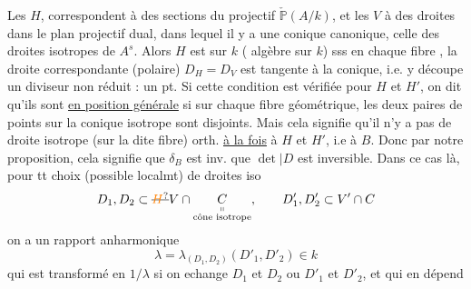  

Les $H$, correspondent à des sections  du   projectif   $\check{\mathbb{P}}(A/k)$, et les $V$ à des droites dans le plan projectif dual, dans lequel il y a une conique canonique, celle des droites isotropes de $A^s$. Alors $H$ est  sur $k$ ( algèbre sur $k$) sss en chaque  fibre , la droite correspondante (polaire) $D_H=D_V$ est tangente à la conique, i.e. y découpe un diviseur  non réduit : un pt. Si cette condition est vérifiée pour
$H$ et $H'$, on dit qu'ils sont \uline{en position générale} si sur chaque fibre géométrique, les deux paires de points sur la conique isotrope sont disjoints. Mais cela signifie  qu'il n'y a pas de droite isotrope (sur la dite fibre) orth. \uline{à la fois} à $H$ et $H'$, i.e à $B$. Donc par notre proposition, cela signifie que $\delta_B$ est inv.  que $\det\big|D$ est inversible.  Dans ce cas là,  pour tt choix (possible localmt)  de droites iso
\[
 D_1,D_2\subset \deleted{\unsure{H}}V\cap\underset{\substack{\shortparallel\\\text{cône isotrope}}}{C},\qquad D'_1,D'_2\subset V'\cap C
\]
on a un rapport anharmonique
\[
 \lambda=\lambda_{(D_1,D_2)}(D'_1,D'_2)\in k
\]
qui est transformé en $1/\lambda$ si on echange $D_1$ et $D_2$ ou $D'_1$ et $D'_2$, et qui en dépend
